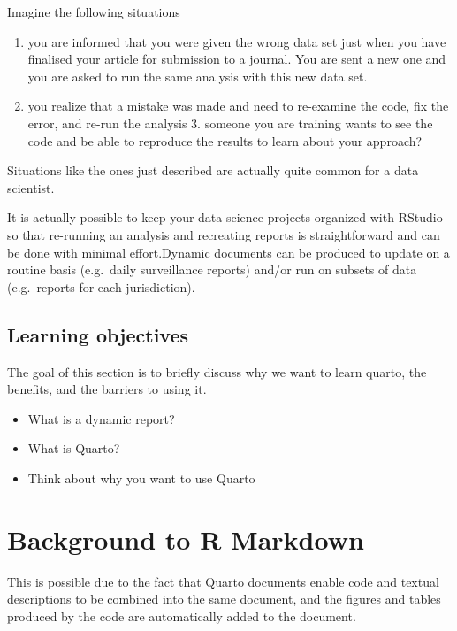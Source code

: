 \documentclass[
  letterpaper,
  DIV=11,
  numbers=noendperiod,
  oneside]{scrreprt}
\providecommand{\tightlist}{%
  \setlength{\itemsep}{0pt}\setlength{\parskip}{0pt}}\usepackage{longtable,booktabs,array}
\begin{document}
Imagine the following situations

\begin{enumerate}
\def\labelenumi{\arabic{enumi}.}
\tightlist
\item
  you are informed that you were given the wrong data set just when you
  have finalised your article for submission to a journal. You are sent
  a new one and you are asked to run the same analysis with this new
  data set.
\item
  you realize that a mistake was made and need to re-examine the code,
  fix the error, and re-run the analysis 3. someone you are training
  wants to see the code and be able to reproduce the results to learn
  about your approach?
\end{enumerate}

Situations like the ones just described are actually quite common for a
data scientist.

It is actually possible to keep your data science projects organized
with RStudio so that re-running an analysis and recreating reports is
straightforward and can be done with minimal effort.Dynamic documents
can be produced to update on a routine basis (e.g.~daily surveillance
reports) and/or run on subsets of data (e.g.~reports for each
jurisdiction).

\hypertarget{learning-objectives-4}{%
\subsection{Learning objectives}\label{learning-objectives-4}}

The goal of this section is to briefly discuss why we want to learn
quarto, the benefits, and the barriers to using it.

\begin{itemize}
\tightlist
\item
  What is a dynamic report?
\item
  What is Quarto?
\item
  Think about why you want to use Quarto
\end{itemize}

\hypertarget{background-to-r-markdown}{%
\section{Background to R Markdown}\label{background-to-r-markdown}}

This is possible due to the fact that Quarto documents enable code and
textual descriptions to be combined into the same document, and the
figures and tables produced by the code are automatically added to the
document.
\end{document}

